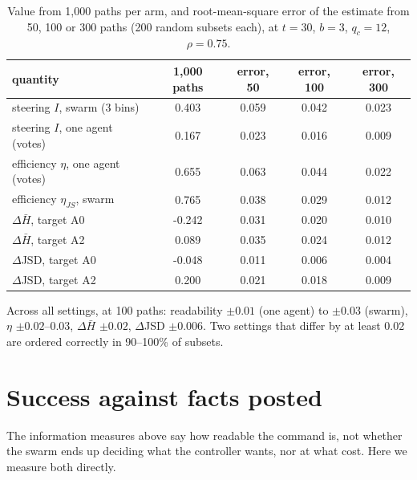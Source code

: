 \documentclass[10pt,a4paper]{article}
\begin{document}
\begin{table}[H]
\centering\small
\caption{Value from 1{,}000 paths per arm, and root-mean-square error of the estimate from 50, 100
or 300 paths (200 random subsets each), at $t = 30$, $b = 3$, $q_c = 12$, $\rho = 0.75$.}
\label{tab:effprec}
\begin{tabular}{lcccc}
\toprule
quantity & 1{,}000 paths & error, 50 & error, 100 & error, 300 \\
\midrule
steering $I$, swarm (3 bins) & 0.403 & 0.059 & 0.042 & 0.023 \\
steering $I$, one agent (votes) & 0.167 & 0.023 & 0.016 & 0.009 \\
efficiency $\eta$, one agent (votes) & 0.655 & 0.063 & 0.044 & 0.022 \\
efficiency $\eta_{JS}$, swarm & 0.765 & 0.038 & 0.029 & 0.012 \\
$\Delta\bar H$, target A0 & -0.242 & 0.031 & 0.020 & 0.010 \\
$\Delta\bar H$, target A2 & 0.089 & 0.035 & 0.024 & 0.012 \\
$\Delta$JSD, target A0 & -0.048 & 0.011 & 0.006 & 0.004 \\
$\Delta$JSD, target A2 & 0.200 & 0.021 & 0.018 & 0.009 \\
\bottomrule
\end{tabular}
\end{table}

\noindent Across all settings, at 100 paths: readability $\pm0.01$ (one agent) to $\pm0.03$ (swarm),
$\eta$ $\pm0.02$--$0.03$, $\Delta\bar H$ $\pm0.02$, $\Delta$JSD $\pm0.006$. Two settings that differ by
at least 0.02 are ordered correctly in 90--100\% of subsets.

\section{Success against facts posted}\label{sec:success}

The information measures above say how readable the command is, not whether the swarm ends up
deciding what the controller wants, nor at what cost. Here we measure both directly.
\end{document}
